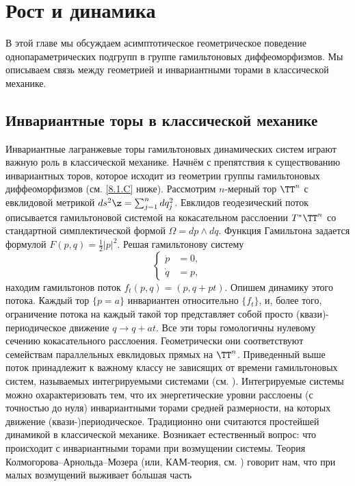 \chapter{Рост и динамика}

В этой главе мы обсуждаем асимптотическое геометрическое поведение однопараметрических подгрупп в группе гамильтоновых диффеоморфизмов.
Мы описываем связь между геометрией и инвариантными торами в классической механике.

\section{Инвариантные торы в классической механике}

Инвариантные лагранжевые торы гамильтоновых динамических систем играют важную роль в классической механике.
Начнём с препятствия к существованию инвариантных торов, которое исходит из геометрии группы гамильтоновых диффеоморфизмов (см. \ref{8.1.C} ниже).
Рассмотрим $n$-мерный тор $\TT^n$ с евклидовой метрикой $ds^2 \z= \sum^n_{j = 1} dq_j^2$.
Евклидов геодезический поток описывается гамильтоновой системой на кокасательном расслоении $T^\ast \TT^n$ со стандартной симплектической формой $\Omega = dp \wedge dq$.
Функция Гамильтона задается формулой $F (p, q) = \tfrac12 | p |^2$.
Решая гамильтонову систему 
\[
\begin{cases}
\dot p &= 0,\\
\dot q &= p,
\end{cases}
\]
находим гамильтонов поток $f_t (p, q) = (p, q + pt)$.
Опишем динамику этого потока.
Каждый тор $\{p = a\}$ инвариантен относительно $\{f_t\}$, и, более того, ограничение потока на каждый такой тор представляет собой просто (квази)-периодическое движение $q \to q + at$.
Все эти торы гомологичны нулевому сечению кокасательного расслоения.
Геометрически они соответствуют семействам параллельных евклидовых прямых на $\TT^n$.
Приведенный выше поток принадлежит к важному классу не зависящих от времени гамильтоновых систем, называемых интегрируемыми системами (см. \cite{Ar}).
Интегрируемые системы можно охарактеризовать тем, что их энергетические уровни расслоены (с точностью до нуля) инвариантными торами средней размерности, на которых движение (квази-)периодическое.
Традиционно они считаются простейшей динамикой в классической механике.
Возникает естественный вопрос: что происходит с инвариантными торами при возмущении системы.
Теория Колмогорова--Арнольда--Мозера (или, КАМ-теория, см. \cite{Ar})
говорит нам, что при малых возмущений выживает б\'{о}льшая часть
